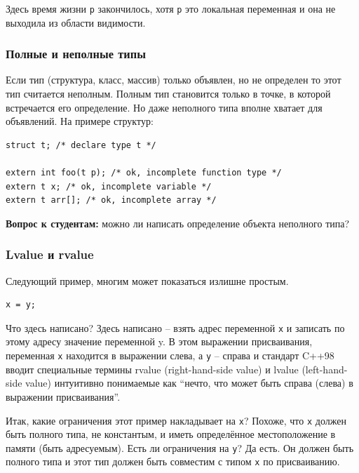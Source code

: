 \documentclass[a4paper,12pt,oneside]{article}
\newif\ifanswers
\begin{document}
Здесь время жизни \lstinline!p! закончилось, хотя \lstinline!p! это локальная переменная и она не выходила из области видимости.

\subsubsection{Полные и неполные типы}

Если тип (структура, класс, массив) только объявлен, но не определен то этот тип считается неполным. Полным тип становится только в точке, в которой встречается его определение. Но даже неполного типа вполне хватает для объявлений. На примере структур:

\begin{lstlisting}
struct t; /* declare type t */

extern int foo(t p); /* ok, incomplete function type */
extern t x; /* ok, incomplete variable */
extern t arr[]; /* ok, incomplete array */
\end{lstlisting}

\textbf{Вопрос к студентам:} можно ли написать определение объекта неполного типа?

\ifanswers
Правильный ответ: конечно нет, так как неизвестно сколько памяти надо такому объекту. Но можно написать определение указателя на такой объект.
\fi

\subsubsection{Lvalue и rvalue}\label{LRvalues}

Следующий пример, многим может показаться излишне простым.

\begin{lstlisting}
x = y;
\end{lstlisting}

Что здесь написано? Здесь написано – взять адрес переменной \lstinline!x! и записать по этому адресу значение переменной y. В этом выражении присваивания, переменная \lstinline!x! находится в выражении слева, а \lstinline!y! -- справа и стандарт C++98 вводит специальные термины rvalue (right-hand-side value) и lvalue (left-hand-side value) интуитивно понимаемые как ``нечто, что может быть справа (слева) в выражении присваивания''. 

Итак, какие ограничения этот пример накладывает на \lstinline!x!? Похоже, что \lstinline!x! должен быть полного типа, не константым, и иметь определённое местоположение в памяти (быть адресуемым). Есть ли ограничения на \lstinline!y!? Да есть. Он должен быть полного типа и этот тип должен быть совместим с типом \lstinline!x! по присваиванию.  
\end{document}
